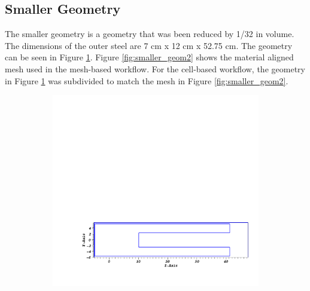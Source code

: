 \subsection{Smaller Geometry}
The smaller geometry is a geometry that was been reduced by 1/32 in volume. 
The dimensions of the outer steel are 7 cm x 12 cm x 52.75 cm. 
The geometry can be seen in Figure \ref{fig:smaller_geom1}. 
Figure \ref{fig:smaller_geom2} shows the material aligned mesh used in 
the mesh-based workflow. 
For the cell-based workflow, the geometry in Figure \ref{fig:smaller_geom1}
was subdivided to match the mesh in Figure \ref{fig:smaller_geom2}. 
\begin{figure}[!h]
    \begin{subfigure}{1\textwidth}
        \centering
        \includegraphics[scale=0.4, trim={4cm 3cm 1cm 22cm}, clip]{figs/mesh_geom.png}
        \caption{}
        \label{fig:smaller_geom1}
    \end{subfigure}
    \begin{subfigure}{1\textwidth}
        \centering

\end{subfigure}
\end{figure}
